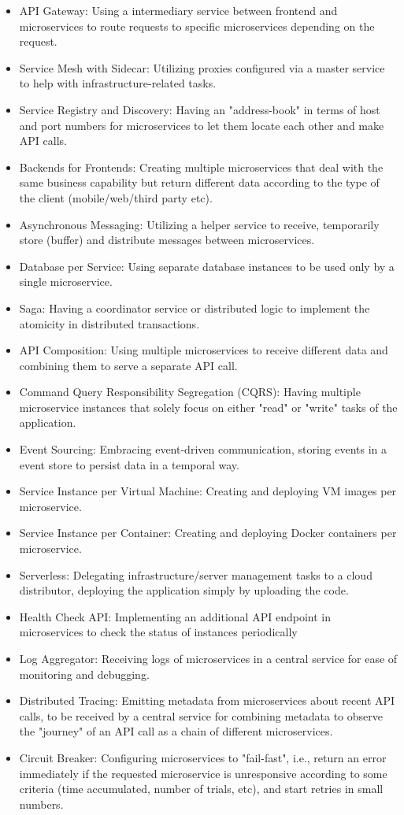 \documentclass[11pt,a4paper,twocolumn]{article}
\begin{document}
\begin{itemize}
    \item API Gateway: Using a intermediary service between frontend and microservices to route requests to specific microservices depending on the request.
    \item Service Mesh with Sidecar: Utilizing proxies configured via a master service to help with infrastructure-related tasks.
    \item Service Registry and Discovery: Having an "address-book" in terms of host and port numbers for microservices to let them locate each other and make API calls.
    \item Backends for Frontends: Creating multiple microservices that deal with the same business capability but return different data according to the type of the client (mobile/web/third party etc).
    \item Asynchronous Messaging: Utilizing a helper service to receive, temporarily store (buffer) and distribute messages between microservices.
    \item Database per Service: Using separate database instances to be used only by a single microservice.
    \item Saga: Having a coordinator service or distributed logic to implement the atomicity in distributed transactions.
    \item API Composition: Using multiple microservices to receive different data and combining them to serve a separate API call.
    \item Command Query Responsibility Segregation (CQRS): Having multiple microservice instances that solely focus on either "read" or "write" tasks of the application.
    \item Event Sourcing: Embracing event-driven communication, storing events in a event store to persist data in a temporal way.
    \item Service Instance per Virtual Machine: Creating and deploying VM images per microservice.
    \item Service Instance per Container: Creating and deploying Docker containers per microservice.
    \item Serverless: Delegating infrastructure/server management tasks to a cloud distributor, deploying the application simply by uploading the code.
    \item Health Check API: Implementing an additional API endpoint in microservices to check the status of instances periodically
    \item Log Aggregator: Receiving logs of microservices in a central service for ease of monitoring and debugging.
    \item Distributed Tracing: Emitting metadata from microservices about recent API calls, to be received by a central service for combining metadata to observe the "journey" of an API call as a chain of different microservices.
    \item Circuit Breaker: Configuring microservices to "fail-fast", i.e., return an error immediately if the requested microservice is unresponsive according to some criteria (time accumulated, number of trials, etc), and start retries in small numbers.
\end{itemize}
\end{document}
